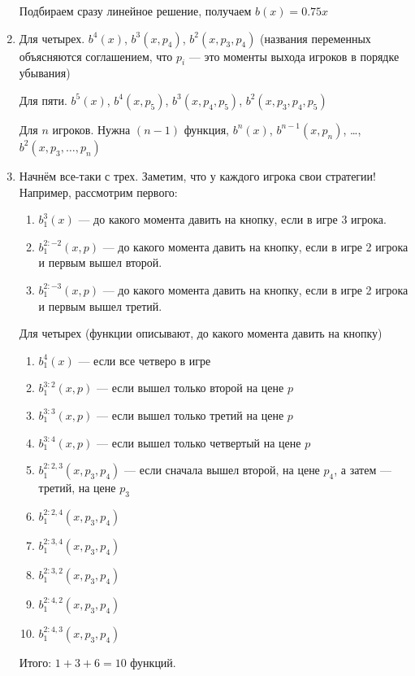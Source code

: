 \begin{enumerate}
Подбираем сразу линейное решение, получаем $ b(x)=0.75x $

\item Для четырех. $ b^{4}(x) $, $ b^{3}(x,p_{4}) $, $ b^{2}(x,p_{3},p_{4}) $ (названия переменных объясняются соглашением, что $ p_{i} $ — это моменты выхода игроков в порядке убывания)

Для пяти. $ b^{5}(x) $, $ b^{4}(x,p_{5}) $, $ b^{3}(x,p_{4},p_{5}) $, $ b^{2}(x,p_{3},p_{4},p_{5}) $

Для $ n $ игроков. Нужна $ (n-1) $ функция, $ b^{n}(x) $, $ b^{n-1}(x,p_{n}) $, \ldots, $ b^{2}(x,p_{3},\ldots,p_{n}) $

\item Начнём все-таки с трех. Заметим, что у каждого игрока свои стратегии! Например, рассмотрим первого:
\begin{enumerate}
\item $b_{1}^{3}(x)$ — до какого момента давить на кнопку, если в игре 3 игрока.
\item $b_{1}^{2:-2}(x,p) $ — до какого момента давить на кнопку, если в игре 2 игрока и первым вышел второй.
\item $b_{1}^{2:-3}(x,p) $ — до какого момента давить на кнопку, если в игре 2 игрока и первым вышел третий.
\end{enumerate}

Для четырех (функции описывают, до какого момента давить на кнопку)
\begin{enumerate}
\item $b_{1}^{4}(x)$ — если все четверо в игре
\item $b_{1}^{3:2}(x,p) $ — если вышел только второй на цене $ p $
\item $b_{1}^{3:3}(x,p) $ — если вышел только третий на цене $ p $
\item $b_{1}^{3:4}(x,p) $ — если вышел только четвертый на цене $ p $

\item $b_{1}^{2:2,3}(x,p_{3},p_{4}) $ — если сначала вышел второй, на цене $ p_{4} $, а затем — третий, на цене $ p_{3} $
\item $b_{1}^{2:2,4}(x,p_{3},p_{4}) $
\item $b_{1}^{2:3,4}(x,p_{3},p_{4}) $
\item $b_{1}^{2:3,2}(x,p_{3},p_{4}) $
\item $b_{1}^{2:4,2}(x,p_{3},p_{4}) $
\item $b_{1}^{2:4,3}(x,p_{3},p_{4}) $
\end{enumerate}
Итого: $1+3+6=10$ функций.


\end{enumerate}

